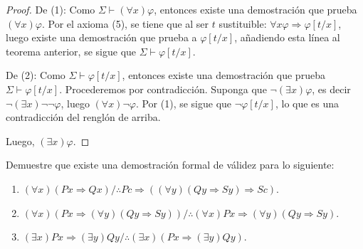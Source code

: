 \documentclass[12pt]{report}
\newcounter{it}
\theoremstyle{largebreak}
\begin{document}
    \begin{proof}
        De (1): Como $\Sigma\vdash(\forall x)\varphi$, entonces existe una demostración que prueba $(\forall x)\varphi$. Por el axioma (5), se tiene que al ser $t$ sustituible: $\forall x\varphi\Rightarrow\varphi\left[t/x \right]$, luego existe una demostración que prueba a $\varphi\left[t/x \right]$, añadiendo esta línea al teorema anterior, se sigue que $\Sigma\vdash\varphi\left[t/x \right]$.

        De (2): Como $\Sigma\vdash\varphi[t/x]$, entonces existe una demostración que prueba $\Sigma\vdash\varphi[t/x]$. Procederemos por contradicción. Suponga que $\neg(\exists x)\varphi$, es decir $\neg(\exists x)\neg\neg\varphi$, luego $(\forall x)\neg\varphi$. Por (1), se sigue que $\neg\varphi[t/x]$, lo que es una contradicción del renglón de arriba.

        Luego, $(\exists x)\varphi$.
    \end{proof}

    \begin{excer}
        Demuestre que existe una demostración formal de válidez para lo siguiente:
        \begin{enumerate}
            \item $(\forall x)(Px\Rightarrow Qx)/\therefore Pc\Rightarrow((\forall y)(Qy\Rightarrow Sy)\Rightarrow Sc)$.
            \item $(\forall x)(Px\Rightarrow(\forall y)(Qy\Rightarrow Sy))/\therefore (\forall x)Px\Rightarrow(\forall y)(Qy\Rightarrow Sy)$.
            \item $(\exists x)Px\Rightarrow (\exists y)Qy/\therefore (\exists x)(Px\Rightarrow (\exists y)Qy)$.
        \end{enumerate}
    \end{excer}
\end{document}

